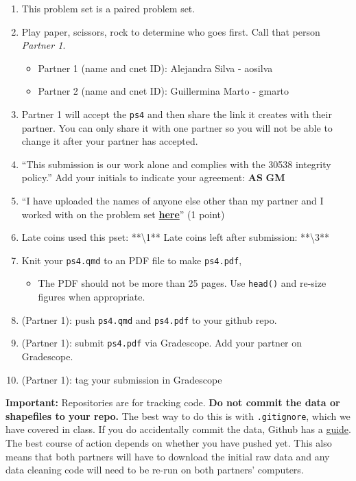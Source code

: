 \documentclass[
  letterpaper,
  DIV=11,
  numbers=noendperiod]{scrartcl}
\providecommand{\tightlist}{%
  \setlength{\itemsep}{0pt}\setlength{\parskip}{0pt}}\usepackage{longtable,booktabs,array}
\begin{document}
\begin{enumerate}
\def\labelenumi{\arabic{enumi}.}
\tightlist
\item
  This problem set is a paired problem set.
\item
  Play paper, scissors, rock to determine who goes first. Call that
  person \emph{Partner 1}.

  \begin{itemize}
  \tightlist
  \item
    Partner 1 (name and cnet ID): Alejandra Silva - aosilva
  \item
    Partner 2 (name and cnet ID): Guillermina Marto - gmarto
  \end{itemize}
\item
  Partner 1 will accept the \texttt{ps4} and then share the link it
  creates with their partner. You can only share it with one partner so
  you will not be able to change it after your partner has accepted.
\item
  ``This submission is our work alone and complies with the 30538
  integrity policy.'' Add your initials to indicate your agreement:
  \textbf{AS} \textbf{GM}
\item
  ``I have uploaded the names of anyone else other than my partner and I
  worked with on the problem set
  \textbf{\href{https://docs.google.com/forms/d/185usrCREQaUbvAXpWhChkjghdGgmAZXA3lPWpXLLsts/edit}{here}}''
  (1 point)
\item
  Late coins used this pset: **\textbackslash1** Late coins left after
  submission: **\textbackslash3**
\item
  Knit your \texttt{ps4.qmd} to an PDF file to make \texttt{ps4.pdf},

  \begin{itemize}
  \tightlist
  \item
    The PDF should not be more than 25 pages. Use \texttt{head()} and
    re-size figures when appropriate.
  \end{itemize}
\item
  (Partner 1): push \texttt{ps4.qmd} and \texttt{ps4.pdf} to your github
  repo.
\item
  (Partner 1): submit \texttt{ps4.pdf} via Gradescope. Add your partner
  on Gradescope.
\item
  (Partner 1): tag your submission in Gradescope
\end{enumerate}

\textbf{Important:} Repositories are for tracking code. \textbf{Do not
commit the data or shapefiles to your repo.} The best way to do this is
with \texttt{.gitignore}, which we have covered in class. If you do
accidentally commit the data, Github has a
\href{https://docs.github.com/en/repositories/working-with-files/managing-large-files/about-large-files-on-github\#removing-files-from-a-repositorys-history}{guide}.
The best course of action depends on whether you have pushed yet. This
also means that both partners will have to download the initial raw data
and any data cleaning code will need to be re-run on both partners'
computers.
\end{document}
